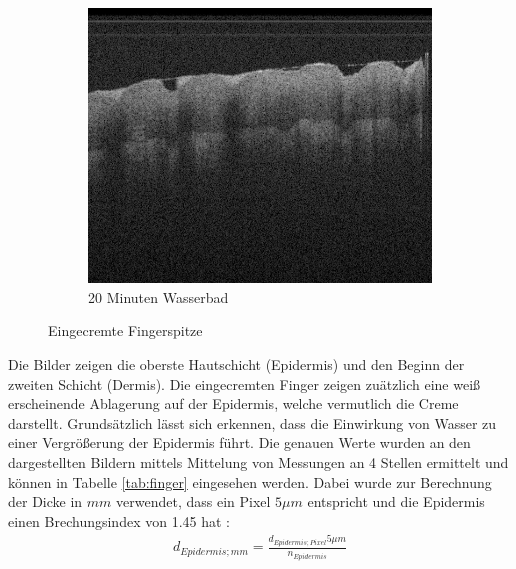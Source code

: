 \documentclass[german, %
parskip=full, %
bibliography=totoc, %
]{scrartcl}
\begin{document}
\begin{figure}[ht]
\begin{subfigure}[b]{0.3\textwidth}
	   \includegraphics[width=\textwidth]{finger_creme_3}
		 \caption{20 Minuten Wasserbad}
	\end{subfigure}
  \caption{Eingecremte Fingerspitze}
	\label{fig:creme}
\end{figure}

Die Bilder zeigen die oberste Hautschicht (Epidermis) und den Beginn der zweiten Schicht (Dermis). Die eingecremten Finger zeigen zuätzlich eine weiß erscheinende Ablagerung auf der Epidermis, welche vermutlich die Creme darstellt. Grundsätzlich lässt sich erkennen, dass die Einwirkung von Wasser zu einer Vergrößerung der Epidermis führt. Die genauen Werte wurden an den dargestellten Bildern mittels Mittelung von Messungen an 4 Stellen ermittelt und können in Tabelle \ref{tab:finger} eingesehen werden. Dabei wurde zur Berechnung der Dicke in $mm$ verwendet, dass ein Pixel $5 \mu m$ entspricht und die Epidermis einen Brechungsindex von 1.45 hat \cite{brechung}:
\begin{align}
d_{Epidermis; mm} = \frac{d_{Epidermis; Pixel}5\mu m}{n_{Epidermis}}
\end{align}
\end{document}
